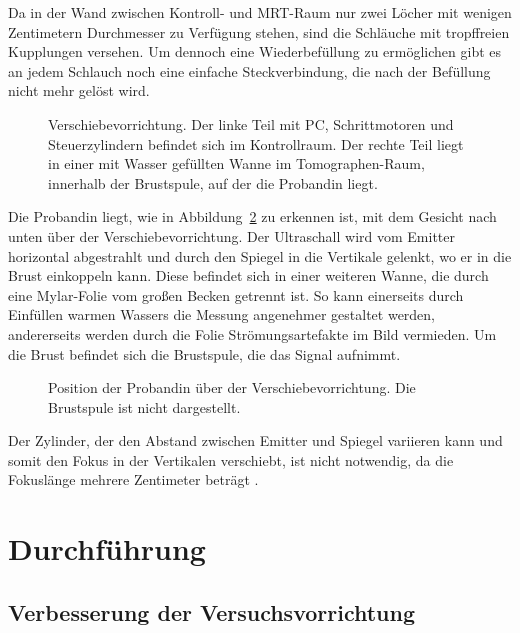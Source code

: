 \documentclass[
    11pt,
    ngerman
]{scrbook}
\begin{document}
Da in der Wand zwischen Kontroll- und MRT-Raum nur zwei Löcher mit wenigen
Zentimetern Durchmesser zu Verfügung stehen, sind die Schläuche mit
tropffreien Kupplungen versehen. Um dennoch eine Wiederbefüllung zu ermöglichen
gibt es an jedem Schlauch noch eine einfache Steckverbindung, die nach der
Befüllung nicht mehr gelöst wird.

\begin{figure}[htbp]
    \centering
    \resizebox{\textwidth}{!}{}
    \caption{%
        Verschiebevorrichtung. Der linke Teil mit PC, Schrittmotoren und Steuerzylindern befindet sich im Kontrollraum. Der rechte Teil liegt in einer mit Wasser gefüllten Wanne im Tomographen-Raum, innerhalb der Brustspule, auf der die Probandin liegt.
    }
    \label{fig:aufbau_total}
\end{figure}

Die Probandin liegt, wie in Abbildung~\ref{fig:aufbau_emitter_spiegel} zu
erkennen ist, mit dem Gesicht nach unten über der Verschiebevorrichtung. Der
Ultraschall wird vom Emitter horizontal abgestrahlt und durch den Spiegel in
die Vertikale gelenkt, wo er in die Brust einkoppeln kann. Diese befindet sich
in einer weiteren Wanne, die durch eine Mylar-Folie vom großen Becken getrennt
ist. So kann einerseits durch Einfüllen warmen Wassers die Messung angenehmer
gestaltet werden, andererseits werden durch die Folie Strömungsartefakte im
Bild vermieden. Um die Brust befindet sich die Brustspule, die das Signal
aufnimmt.

\begin{figure}[htbp]
    \centering
    \resizebox{.9\textwidth}{!}{}
    \caption{%
        Position der Probandin über der Verschiebevorrichtung. Die Brustspule ist nicht dargestellt.
    }
    \label{fig:aufbau_emitter_spiegel}
\end{figure}

Der Zylinder, der den Abstand zwischen Emitter und Spiegel variieren kann und
somit den Fokus in der Vertikalen verschiebt, ist nicht notwendig, da die
Fokuslänge mehrere Zentimeter beträgt \parencite{dipl_kofahl}.

\chapter{Durchführung}

\section{Verbesserung der Versuchsvorrichtung}
\end{document}
